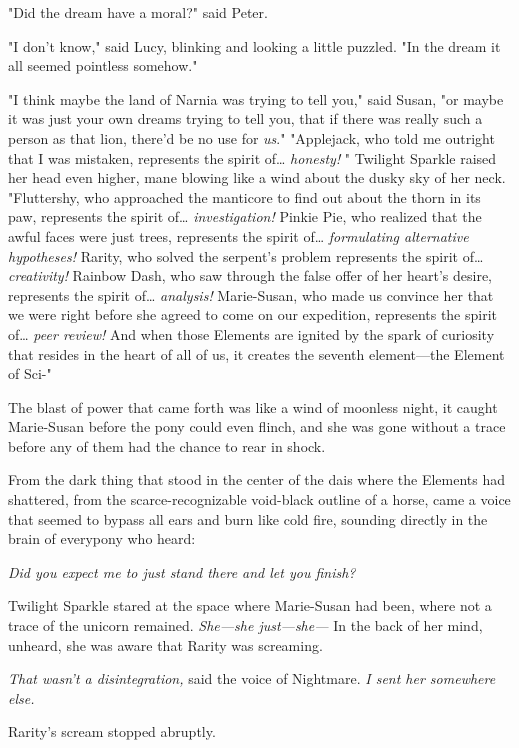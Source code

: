 "Did the dream have a moral?" said Peter.

"I don't know," said Lucy, blinking and looking a little puzzled. "In the dream
it all seemed pointless somehow."

"I think maybe the land of Narnia was trying to tell you," said Susan, "or
maybe it was just your own dreams trying to tell you, that if there was really
such a person as that lion, there'd be no use for \emph{us}."
\sbreak
"Applejack, who told me outright that I was mistaken, represents the spirit
of{\ldots} \emph{honesty!} " Twilight Sparkle raised her head even higher, mane
blowing like a wind about the dusky sky of her neck. "Fluttershy, who
approached the manticore to find out about the thorn in its paw, represents the
spirit of{\ldots} \emph{investigation!} Pinkie Pie, who realized that the awful
faces were just trees, represents the spirit of{\ldots} \emph{formulating
alternative hypotheses!} Rarity, who solved the serpent's problem represents
the spirit of{\ldots} \emph{creativity!} Rainbow Dash, who saw through the
false offer of her heart's desire, represents the spirit of{\ldots}
\emph{analysis!} Marie-Susan, who made us convince her that we were right
before she agreed to come on our expedition, represents the spirit of{\ldots}
\emph{peer review!} And when those Elements are ignited by the spark of
curiosity that resides in the heart of all of us, it creates the seventh
element---the Element of Sci-"

The blast of power that came forth was like a wind of moonless night, it caught
Marie-Susan before the pony could even flinch, and she was gone without a trace
before any of them had the chance to rear in shock.

From the dark thing that stood in the center of the dais where the Elements had
shattered, from the scarce-recognizable void-black outline of a horse, came a
voice that seemed to bypass all ears and burn like cold fire, sounding directly
in the brain of everypony who heard:

\emph{Did you expect me to just stand there and let you finish?}

Twilight Sparkle stared at the space where Marie-Susan had been, where not a
trace of the unicorn remained. \emph{She---she just---she---} In the back of
her mind, unheard, she was aware that Rarity was screaming.

\emph{That wasn't a disintegration,} said the voice of Nightmare. \emph{I sent
her somewhere else.}

Rarity's scream stopped abruptly.

